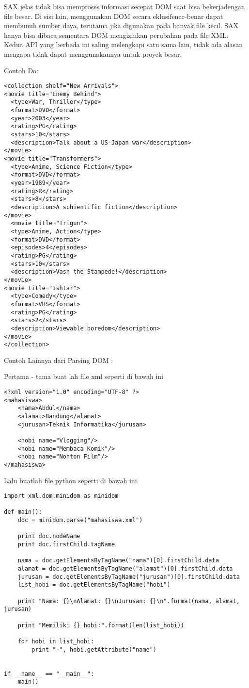 SAX jelas tidak bisa memproses informasi secepat DOM saat bisa bekerjadengan file besar. Di sisi lain, menggunakan DOM secara eklusifenar-benar dapat membunuh sumber daya, terutama jika digunakan pada banyak file kecil. SAX hanya bisa dibaca sementara DOM mengizinkan perubahan pada file XML. Kedua API yang berbeda ini saling melengkapi satu sama lain, tidak ada alasan mengapa tidak dapat menggunakannya untuk proyek besar. 

Contoh Do: 
\begin{verbatim}
<collection shelf="New Arrivals"> 
<movie title="Enemy Behind"> 
  <type>War, Thriller</type> 
  <format>DVD</format> 
  <year>2003</year> 
  <rating>PG</rating> 
  <stars>10</stars>
  <description>Talk about a US-Japan war</description> 
</movie> 
<movie title="Transformers"> 
  <type>Anime, Science Fiction</type> 
  <format>DVD</format> 
  <year>1989</year> 
  <rating>R</rating> 
  <stars>8</stars> 
  <description>A schientific fiction</description> 
</movie> 
  <movie title="Trigun"> 
  <type>Anime, Action</type> 
  <format>DVD</format> 
  <episodes>4</episodes>  
  <rating>PG</rating> 
  <stars>10</stars> 
  <description>Vash the Stampede!</description> 
</movie>
<movie title="Ishtar"> 
  <type>Comedy</type> 
  <format>VHS</format> 
  <rating>PG</rating> 
  <stars>2</stars> 
  <description>Viewable boredom</description> 
</movie> 
</collection> 
\end{verbatim}

Contoh Lainnya dari Parsing DOM : 

Pertama - tama buat lah file xml seperti di bawah ini
\begin{verbatim}
<?xml version="1.0" encoding="UTF-8" ?>
<mahasiswa>
    <nama>Abdul</nama>
	<alamat>Bandung</alamat>
	<jurusan>Teknik Informatika</jurusan>

	<hobi name="Vlogging"/>
	<hobi name="Membaca Komik"/>
	<hobi name="Nonton Film"/>
</mahasiswa>
\end{verbatim}

Lalu buatlah file python seperti di bawah ini.
\begin{verbatim}
import xml.dom.minidom as minidom

def main():
    doc = minidom.parse("mahasiswa.xml")

    print doc.nodeName
    print doc.firstChild.tagName

    nama = doc.getElementsByTagName("nama")[0].firstChild.data
    alamat = doc.getElementsByTagName("alamat")[0].firstChild.data
    jurusan = doc.getElementsByTagName("jurusan")[0].firstChild.data
    list_hobi = doc.getElementsByTagName("hobi")

    print "Nama: {}\nAlamat: {}\nJurusan: {}\n".format(nama, alamat, jurusan)

    print "Memiliki {} hobi:".format(len(list_hobi))

    for hobi in list_hobi:
        print "-", hobi.getAttribute("name")


if __name__ == "__main__":
    main()
\end{verbatim}


